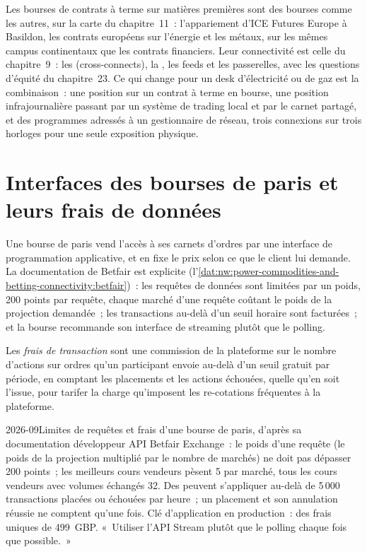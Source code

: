 Les bourses de contrats à terme sur matières premières sont des bourses comme les autres, sur la carte du chapitre~11~: l'appariement d'ICE Futures Europe à Basildon, les
contrats européens sur l'énergie et les métaux, sur les mêmes campus continentaux que les contrats financiers. Leur connectivité est celle du chapitre~9~:
les  (cross-connects), la , les feeds et les passerelles, avec les questions d'équité du chapitre~23. Ce qui change pour un desk d'électricité ou de gaz est
la combinaison~: une position sur un contrat à terme en bourse, une position infrajournalière passant par un système de trading local et par le carnet partagé, et
des programmes adressés à un gestionnaire de réseau, trois connexions sur trois horloges pour une seule exposition physique.

\section{Interfaces des bourses de paris et leurs frais de données}

Une bourse de paris vend l'accès à ses carnets d'ordres par une interface de programmation applicative, et en fixe le prix selon ce que le client
lui demande. La documentation de Betfair est explicite (l'\cref{dat:nw:power-commodities-and-betting-connectivity:betfair})~: les requêtes de données sont
limitées par un poids, 200 points par requête, chaque marché d'une requête coûtant le poids de la projection demandée~; les transactions
au-delà d'un seuil horaire sont facturées~; et la bourse recommande son interface de streaming plutôt que le polling.

\begin{definition}\label{def:nw:power-commodities-and-betting-connectivity:txn}
Les \emph{frais de transaction} sont une commission de la plateforme sur le nombre d'actions sur ordres qu'un participant envoie au-delà d'un
seuil gratuit par période, en comptant les placements et les actions échouées, quelle qu'en soit l'issue, pour tarifer la charge
qu'imposent les re-cotations fréquentes à la plateforme.
\end{definition}

\begin{dated}{2026-09}{Limites de requêtes et frais d'une bourse de paris, d'après sa documentation développeur}\label{dat:nw:power-commodities-and-betting-connectivity:betfair}
API Betfair Exchange~: le poids d'une requête (le poids de la projection multiplié par le nombre de marchés) ne doit pas dépasser 200 points~; les meilleurs cours vendeurs
pèsent 5 par marché, tous les cours vendeurs avec volumes échangés 32. Des  peuvent s'appliquer au-delà de 5\,000 transactions placées ou échouées par heure~;
un placement et son annulation réussie ne comptent qu'une fois. Clé d'application en production~: des frais uniques de 499~GBP. «~Utiliser l'API Stream plutôt
que le polling chaque fois que possible.~»
\end{dated}

